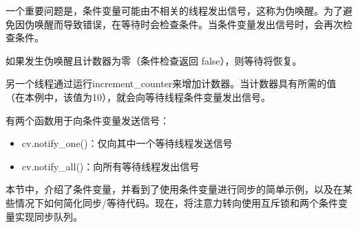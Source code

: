 一个重要问题是，条件变量可能由不相关的线程发出信号，这称为伪唤醒。为了避免因伪唤醒而导致错误，在等待时会检查条件。当条件变量发出信号时，会再次检查条件。

如果发生伪唤醒且计数器为零（条件检查返回 false），则等待将恢复。

另一个线程通过运行increment\_counter来增加计数器。当计数器具有所需的值（在本例中，该值为10），就会向等待线程条件变量发出信号。

有两个函数用于向条件变量发送信号：

\begin{itemize}
\item
cv.notify\_one()：仅向其中一个等待线程发送信号

\item
cv.notify\_all()：向所有等待线程发出信号
\end{itemize}

本节中，介绍了条件变量，并看到了使用条件变量进行同步的简单示例，以及在某些情况下如何简化同步/等待代码。现在，将注意力转向使用互斥锁和两个条件变量实现同步队列。
























